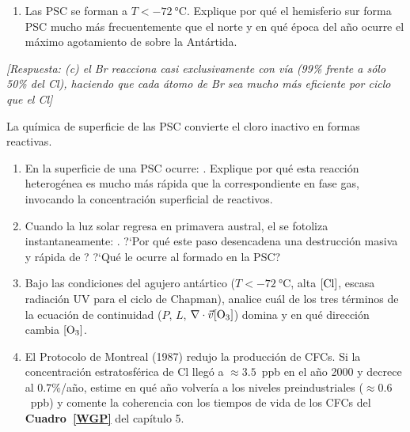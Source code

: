 \begin{bloque_ejercicios}
\begin{ejercicios}
\begin{enumerate}[label=\alph*)]
    \item Las PSC se forman a $T < \SI{-72}{\celsius}$.
          Explique por qu\'e el hemisferio sur forma
          PSC mucho m\'as frecuentemente que el norte
          y en qu\'e \'epoca del a\~no ocurre el m\'aximo
          agotamiento de  sobre la Ant\'artida.
\end{enumerate}

\textit{[Respuesta: (c) el Br reacciona casi exclusivamente
con  v\'ia  (99\% frente a s\'olo 50\%
del Cl), haciendo que cada \'atomo de Br sea mucho
m\'as eficiente por ciclo que el Cl]}

\item La qu\'imica de superficie de las PSC convierte
el cloro inactivo en formas reactivas.

\begin{enumerate}[label=\alph*)]
    \item En la superficie de una PSC ocurre:
          .
          Explique por qu\'e esta reacci\'on heterog\'enea
          es mucho m\'as r\'apida que la correspondiente
          en fase gas, invocando la concentraci\'on
          superficial de reactivos.

    \item Cuando la luz solar regresa en primavera
          austral, el  se fotoliza instantaneamente:
          .
          ?`Por qu\'e este paso desencadena una destrucci\'on
          masiva y r\'apida de ?
          ?`Qu\'e le ocurre al  formado en la PSC?

    \item Bajo las condiciones del agujero ant\'artico
          ($T < \SI{-72}{\celsius}$, alta $[\ce{Cl}]$,
          escasa radiaci\'on UV para el ciclo de Chapman),
          analice cu\'al de los tres t\'erminos de la
          ecuaci\'on de continuidad
          ($P$, $L$, $\nabla\cdot\vec{v}[\ce{O3}]$)
          domina y en qu\'e direcci\'on cambia $[\ce{O3}]$.

    \item El Protocolo de Montreal (1987) redujo la
          producci\'on de CFCs. Si la concentraci\'on
          estratosf\'erica de Cl lleg\'o a $\approx3.5$~ppb
          en el a\~no 2000 y decrece al $0.7\%$/a\~no,
          estime en qu\'e a\~no volver\'ia a los niveles
          preindustriales ($\approx0.6$~ppb) y
          comente la coherencia con los tiempos de vida
          de los CFCs del \textbf{Cuadro~\ref{WGP}}
          del cap\'itulo 5.
\end{enumerate}


\end{ejercicios}
\end{bloque_ejercicios}
